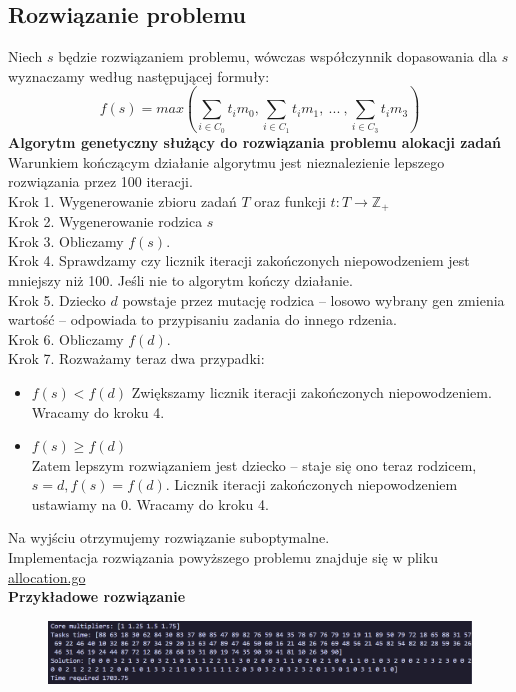 \documentclass{article}
\begin{document}
	\subsection{Rozwiązanie problemu}
	Niech $s$ będzie rozwiązaniem problemu, wówczas współczynnik dopasowania dla $s$
	wyznaczamy według następującej formuły:
	\[
		f(s)=max(\sum_{i\in C_0}t_{i}m_{0},\sum_{i\in C_1}t_{i}m_{1},\ ...\ ,\sum_{i\in
		C_3}t_{i}m_{3})
	\]
	\textbf{Algorytm genetyczny służący do rozwiązania problemu alokacji zadań}\\
	Warunkiem kończącym działanie algorytmu jest nieznalezienie lepszego
	rozwiązania przez 100 iteracji.\\ Krok 1. Wygenerowanie zbioru zadań $T$ oraz
	funkcji $t:T\rightarrow \mathbb{Z_+}$\\ Krok 2. Wygenerowanie rodzica $s$\\
	Krok 3. Obliczamy $f(s)$.\\ Krok 4. Sprawdzamy czy licznik iteracji
	zakończonych niepowodzeniem jest mniejszy niż 100. Jeśli nie to algorytm
	kończy działanie.\\ Krok 5. Dziecko $d$ powstaje przez mutację rodzica -- losowo
	wybrany gen zmienia wartość -- odpowiada to przypisaniu zadania do innego
	rdzenia.\\ Krok 6. Obliczamy $f(d)$.\\ Krok 7. Rozważamy teraz dwa przypadki:
	\begin{itemize}
		\item $f(s) < f(d)$ Zwiększamy licznik iteracji zakończonych niepowodzeniem.
			Wracamy do kroku 4.

		\item $f(s)\geq f(d)$\\ Zatem lepszym rozwiązaniem jest dziecko -- staje się
			ono teraz rodzicem, $s=d, f(s)=f(d)$. Licznik iteracji zakończonych niepowodzeniem
			ustawiamy na 0. Wracamy do kroku 4.
	\end{itemize}
	Na wyjściu otrzymujemy rozwiązanie suboptymalne.\\ Implementacja rozwiązania powyższego
	problemu znajduje się w pliku \href{https://github.com/Kaniek99/AIbasics/blob/main/src/allocation/allocation.go}{allocation.go}\\
	\textbf{Przykładowe rozwiązanie}\\
	\begin{figure}[h]
		\includegraphics[width=\linewidth]{allocation_example.png}
	\end{figure}
	\newpage
\end{document}
